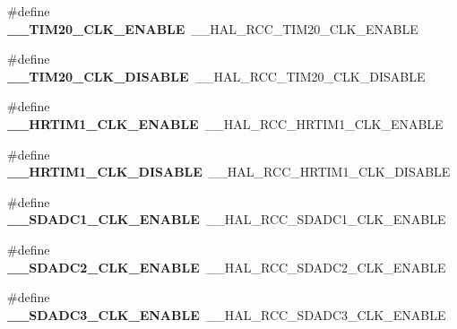 \begin{DoxyCompactItemize}
\item 
\mbox{\label{group___h_a_l___r_c_c___aliased_ga1be7819837c9d5ce89b5006858aa2c78}} 
\#define {\bfseries \+\_\+\+\_\+\+T\+I\+M20\+\_\+\+C\+L\+K\+\_\+\+E\+N\+A\+B\+LE}~\+\_\+\+\_\+\+H\+A\+L\+\_\+\+R\+C\+C\+\_\+\+T\+I\+M20\+\_\+\+C\+L\+K\+\_\+\+E\+N\+A\+B\+LE
\item 
\mbox{\label{group___h_a_l___r_c_c___aliased_gac795b2f6f86b1444869608b8cdd2ded5}} 
\#define {\bfseries \+\_\+\+\_\+\+T\+I\+M20\+\_\+\+C\+L\+K\+\_\+\+D\+I\+S\+A\+B\+LE}~\+\_\+\+\_\+\+H\+A\+L\+\_\+\+R\+C\+C\+\_\+\+T\+I\+M20\+\_\+\+C\+L\+K\+\_\+\+D\+I\+S\+A\+B\+LE
\item 
\mbox{\label{group___h_a_l___r_c_c___aliased_gaa8ef9aa8aac2736d3795d30295bef523}} 
\#define {\bfseries \+\_\+\+\_\+\+H\+R\+T\+I\+M1\+\_\+\+C\+L\+K\+\_\+\+E\+N\+A\+B\+LE}~\+\_\+\+\_\+\+H\+A\+L\+\_\+\+R\+C\+C\+\_\+\+H\+R\+T\+I\+M1\+\_\+\+C\+L\+K\+\_\+\+E\+N\+A\+B\+LE
\item 
\mbox{\label{group___h_a_l___r_c_c___aliased_gaa4f872cf7c18f0c24f989024d5c6578f}} 
\#define {\bfseries \+\_\+\+\_\+\+H\+R\+T\+I\+M1\+\_\+\+C\+L\+K\+\_\+\+D\+I\+S\+A\+B\+LE}~\+\_\+\+\_\+\+H\+A\+L\+\_\+\+R\+C\+C\+\_\+\+H\+R\+T\+I\+M1\+\_\+\+C\+L\+K\+\_\+\+D\+I\+S\+A\+B\+LE
\item 
\mbox{\label{group___h_a_l___r_c_c___aliased_ga276bdce4ddd1f6b148ce55ccf3160500}} 
\#define {\bfseries \+\_\+\+\_\+\+S\+D\+A\+D\+C1\+\_\+\+C\+L\+K\+\_\+\+E\+N\+A\+B\+LE}~\+\_\+\+\_\+\+H\+A\+L\+\_\+\+R\+C\+C\+\_\+\+S\+D\+A\+D\+C1\+\_\+\+C\+L\+K\+\_\+\+E\+N\+A\+B\+LE
\item 
\mbox{\label{group___h_a_l___r_c_c___aliased_ga16ecec4c60d069b7d6c99aefc8956d79}} 
\#define {\bfseries \+\_\+\+\_\+\+S\+D\+A\+D\+C2\+\_\+\+C\+L\+K\+\_\+\+E\+N\+A\+B\+LE}~\+\_\+\+\_\+\+H\+A\+L\+\_\+\+R\+C\+C\+\_\+\+S\+D\+A\+D\+C2\+\_\+\+C\+L\+K\+\_\+\+E\+N\+A\+B\+LE
\item 
\mbox{\label{group___h_a_l___r_c_c___aliased_ga50aefed27799abc72d6b30099a764208}} 
\#define {\bfseries \+\_\+\+\_\+\+S\+D\+A\+D\+C3\+\_\+\+C\+L\+K\+\_\+\+E\+N\+A\+B\+LE}~\+\_\+\+\_\+\+H\+A\+L\+\_\+\+R\+C\+C\+\_\+\+S\+D\+A\+D\+C3\+\_\+\+C\+L\+K\+\_\+\+E\+N\+A\+B\+LE

\end{DoxyCompactItemize}
